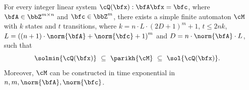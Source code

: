 \begin{lemma}\label{lem:ilp_to_nfa}
For every integer linear system $\cQ(\bfx): \bfA \bfx = \bfc$,
where $\bfA \in \bbZ^{m \times n}$ and $\bfc \in \bbZ^{m}$,
there exists a simple finite automaton $\cM$
with $k$ states and $t$ transitions,
where $k = n\cdot L\cdot(2D+1)^{m} + 1$, 
$t \le 2nk$,
$L = \left((n+1)\cdot\norm{\bfA} + \norm{\bfc} + 1\right)^{m}$
and $D = n \cdot \norm{\bfA} \cdot L$,
    such that
    \begin{equation*}
        \solmin{\cQ(\bfx)}
        \ \subseteq\ 
        \parikh{\cM}
        \ \subseteq\ 
        \sol{\cQ(\bfx)}.
    \end{equation*}
    Moreover, $\cM$ can be constructed in time exponential in $n,m,\norm{\bfA},\norm{\bfc}$.
\end{lemma}

